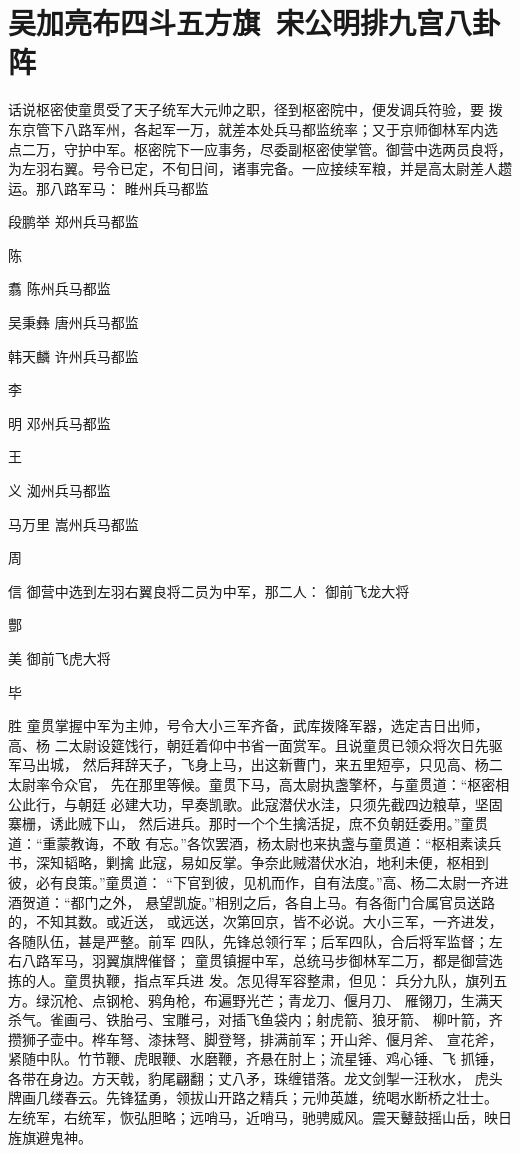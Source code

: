 \chapter{吴加亮布四斗五方旗~宋公明排九宫八卦阵}

话说枢密使童贯受了天子统军大元帅之职，径到枢密院中，便发调兵符验，要
拨东京管下八路军州，各起军一万，就差本处兵马都监统率；又于京师御林军内选
点二万，守护中军。枢密院下一应事务，尽委副枢密使掌管。御营中选两员良将，
为左羽右翼。号令已定，不旬日间，诸事完备。一应接续军粮，并是高太尉差人趱
运。那八路军马：
睢州兵马都监

段鹏举
郑州兵马都监

陈

翥
陈州兵马都监

吴秉彝
唐州兵马都监

韩天麟
许州兵马都监

李

明
邓州兵马都监

王

义
洳州兵马都监

马万里
嵩州兵马都监

周

信
御营中选到左羽右翼良将二员为中军，那二人：
御前飞龙大将

酆

美
御前飞虎大将

毕

胜
童贯掌握中军为主帅，号令大小三军齐备，武库拨降军器，选定吉日出师，高、杨
二太尉设筵饯行，朝廷着仰中书省一面赏军。且说童贯已领众将次日先驱军马出城，
然后拜辞天子，飞身上马，出这新曹门，来五里短亭，只见高、杨二太尉率令众官，
先在那里等候。童贯下马，高太尉执盏擎杯，与童贯道：“枢密相公此行，与朝廷
必建大功，早奏凯歌。此寇潜伏水洼，只须先截四边粮草，坚固寨栅，诱此贼下山，
然后进兵。那时一个个生擒活捉，庶不负朝廷委用。”童贯道：“重蒙教诲，不敢
有忘。”各饮罢酒，杨太尉也来执盏与童贯道：“枢相素读兵书，深知韬略，剿擒
此寇，易如反掌。争奈此贼潜伏水泊，地利未便，枢相到彼，必有良策。”童贯道：
“下官到彼，见机而作，自有法度。”高、杨二太尉一齐进酒贺道：“都门之外，
悬望凯旋。”相别之后，各自上马。有各衙门合属官员送路的，不知其数。或近送，
或远送，次第回京，皆不必说。大小三军，一齐进发，各随队伍，甚是严整。前军
四队，先锋总领行军；后军四队，合后将军监督；左右八路军马，羽翼旗牌催督；
童贯镇握中军，总统马步御林军二万，都是御营选拣的人。童贯执鞭，指点军兵进
发。怎见得军容整肃，但见：
兵分九队，旗列五方。绿沉枪、点钢枪、鸦角枪，布遍野光芒；青龙刀、偃月刀、
雁翎刀，生满天杀气。雀画弓、铁胎弓、宝雕弓，对插飞鱼袋内；射虎箭、狼牙箭、
柳叶箭，齐攒狮子壶中。桦车弩、漆抹弩、脚登弩，排满前军；开山斧、偃月斧、
宣花斧，紧随中队。竹节鞭、虎眼鞭、水磨鞭，齐悬在肘上；流星锤、鸡心锤、飞
抓锤，各带在身边。方天戟，豹尾翩翻；丈八矛，珠缠错落。龙文剑掣一汪秋水，
虎头牌画几缕春云。先锋猛勇，领拔山开路之精兵；元帅英雄，统喝水断桥之壮士。
左统军，右统军，恢弘胆略；远哨马，近哨马，驰骋威风。震天鼙鼓摇山岳，映日
旌旗避鬼神。

